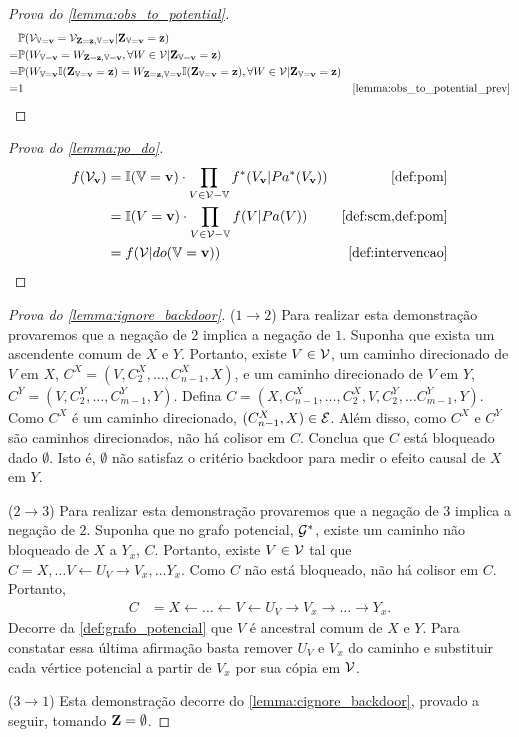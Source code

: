 \begin{proof}[Prova do \cref{lemma:obs_to_potential}]
 \begin{align*}
  &\P(\sV_{\V=\bv} = \sV_{\Z=\bz, \V=\bv}|\Z_{\V=\bv}=\bz) \\
  =& \P(W_{\V=\bv} = W_{\Z=\bz, \V=\bv}, 
  \forall W \in \sV |\Z_{\V=\bv}=\bz) \\
  =& \P(W_{\V=\bv}\I(\Z_{\V=\bv}=\bz) 
  = W_{\Z=\bz, \V=\bv}\I(\Z_{\V=\bv}=\bz), 
  \forall W \in \sV |\Z_{\V=\bv}=\bz) \\
  =& 1 
  & \text{\cref{lemma:obs_to_potential_prev}}
 \end{align*}
\end{proof}

\begin{proof}[Prova do \cref{lemma:po_do}]
 \begin{align*}
  f(\sV_{\bv})
  &= \I(\V = \bv) \cdot \prod_{V \in \sV-\V} f^*(V_{\bv}|Pa^*(V_{\bv}))
  & \text{\cref{def:pom}} \\
  &= \I(V = \bv) \cdot \prod_{V \in \sV-\V} f(V|Pa(V))
  & \text{\cref{def:scm,def:pom}} \\
  &= f(\sV|do(\V=\bv))
  & \text{\cref{def:intervencao}}
 \end{align*}
\end{proof}

\begin{proof}[Prova do \cref{lemma:ignore_backdoor}]
 ($1 \rightarrow 2$)
 Para realizar esta demonstração provaremos que
 a negação de $2$ implica a negação de $1$.
 Suponha que exista um ascendente comum de $X$ e $Y$.
 Portanto, existe $V \in {\mathcal V}$,
 um caminho direcionado de $V$ em $X$, 
 $C^X = (V, C^X_2, \ldots, C^X_{n-1},X)$, e
 um caminho direcionado de $V$ em $Y$,
 $C^Y = (V, C^Y_2, \ldots, C^Y_{m-1},Y)$.
 Defina
 $C = (X, C^X_{n-1}, \ldots, C^X_2, V, C^Y_2, \ldots C^Y_{m-1}, Y)$.
 Como $C^X$ é um caminho direcionado, $(C^X_{n-1}, X) \in {\mathcal E}$.
 Além disso, como $C^X$ e $C^Y$ são caminhos direcionados,
 não há colisor em $C$.
 Conclua que $C$ está bloqueado dado $\emptyset$.
 Isto é, $\emptyset$ não satisfaz o critério backdoor
 para medir o efeito causal de $X$ em $Y$.
 
 ($2 \rightarrow 3$)
 Para realizar esta demonstração provaremos que
 a negação de $3$ implica a negação de $2$.
 Suponha que no grafo potencial, ${\mathcal G}^*$,
 existe um caminho não bloqueado de $X$ a $Y_x$, $C$.
 Portanto, existe $V \in {\mathcal V}$ tal que
 $C = X, \ldots V \leftarrow U_V \rightarrow V_x, \ldots Y_x$.
 Como $C$ não está bloqueado, não há colisor em $C$.
 Portanto,
 \begin{align*}
  C &= X \leftarrow \ldots \leftarrow V \leftarrow U_V 
  \rightarrow V_x \rightarrow \ldots \rightarrow Y_x.
 \end{align*}
 Decorre da \cref{def:grafo_potencial} que
 $V$ é ancestral comum de $X$ e $Y$.
 Para constatar essa última afirmação basta
 remover $U_V$ e $V_x$ do caminho e
 substituir cada vértice potencial 
 a partir de $V_x$ por sua cópia em ${\mathcal V}$.
 
 ($3 \rightarrow 1$)
 Esta demonstração decorre do \cref{lemma:cignore_backdoor},
 provado a seguir, tomando ${\mathbf{Z}} = \emptyset$.
\end{proof}

